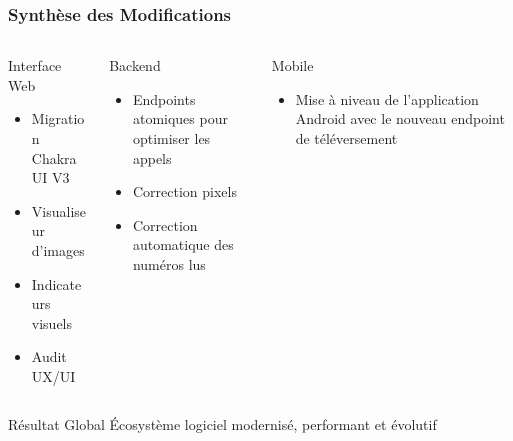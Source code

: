 \documentclass[
	11pt,
	aspectratio=169,
]{beamer}
\begin{document}
\begin{frame}
	\frametitle{Synthèse des Modifications}
	
	\begin{columns}[t]
		\begin{column}{0.32\textwidth}
			\begin{block}{Interface Web}
				\small
				\begin{itemize}
					\item Migration Chakra UI V3
					\item Visualiseur d'images
					\item Indicateurs visuels
					\item Audit UX/UI
				\end{itemize}
			\end{block}
		\end{column}
		
		\begin{column}{0.32\textwidth}
			\begin{block}{Backend}
				\small
				\begin{itemize}
					\item Endpoints atomiques pour optimiser les appels
					\item Correction pixels
					\item Correction automatique des numéros lus
				\end{itemize}
			\end{block}
		\end{column}
		
		\begin{column}{0.32\textwidth}
			\begin{block}{Mobile}
				\small
				\begin{itemize}
					\item Mise à niveau de l'application Android avec le nouveau
					endpoint de téléversement
				\end{itemize}
			\end{block}
		\end{column}
	\end{columns}
	
	\bigskip\bigskip
	
	\begin{exampleblock}{Résultat Global}
		\centering
		Écosystème logiciel modernisé, performant et évolutif
	\end{exampleblock}
\end{frame}
\end{document}
